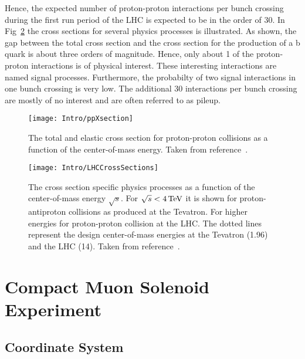 Hence, the expected number of proton-proton interactions per bunch crossing during the first run period of the LHC is expected to be in the order of 30. In Fig~\ref{plot:IntroCrossSections} the cross sections for several physics processes is illustrated. As shown, the gap between the total cross section and the cross section for the production of a b quark is about three orders of magnitude. Hence, only about 1\permil{} of the proton-proton interactions is of physical interest. These interesting interactions are named signal processes. Furthermore, the probabilty of two signal interactions in one bunch crossing is very low. The additional 30 interactions per bunch crossing are mostly of no interest and are often referred to as pileup.

\begin{figure}[Htb]
    \centering
    \texttt{[image: Intro/ppXsection]}
    \caption[Total and elastic cross section for pp interactions]{The total and elastic cross section for proton-proton collisions as a function of the center-of-mass energy. Taken from reference~.\label{plot:IntroTotalCross}}
\end{figure}

\begin{figure}[Htb]
    \centering
    \texttt{[image: Intro/LHCCrossSections]}
    \caption[Cross sections for different physics processes]{The cross section specific physics processes as a function of the center-of-mass energy $\sqrt{s}$. For $\sqrt{s}<4\,\text{Te\hspace{-.08em}V}{}$ it is shown for proton-antiproton collisions as produced at the Tevatron. For higher energies for proton-proton collision at the LHC. The dotted lines represent the design center-of-mass energies at the Tevatron (1.96\TeV{}) and the LHC (14\TeV{}). Taken from reference~.\label{plot:IntroCrossSections}}
\end{figure}

\section{Compact Muon Solenoid Experiment \label{LHCCMSCMS}}

\subsection{Coordinate System \label{LCHCMSCoordSys}}

